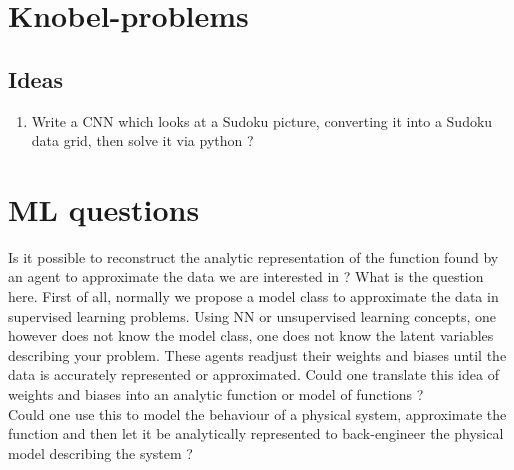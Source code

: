 \section{Knobel-problems}
\subsection{Ideas}
\begin{enumerate}
	\item Write a CNN which looks at a Sudoku picture, converting it into a Sudoku data grid, then solve it via python ?
	
\end{enumerate}
\section{ML questions}
Is it possible to reconstruct the analytic representation of the function found by an agent to approximate the data we are interested in ?
What is the question here. First of all, normally we propose a model class to approximate the data in supervised learning problems. Using NN or unsupervised learning concepts, one however does not know the model class, one does not know the latent variables describing your problem. These agents readjust their weights and biases until the data is accurately represented or approximated. Could one translate this idea of weights and biases into an analytic function or model of functions ?\\
Could one use this to model the behaviour of a physical system, approximate the function and then let it be analytically represented to back-engineer the physical model describing the system ?